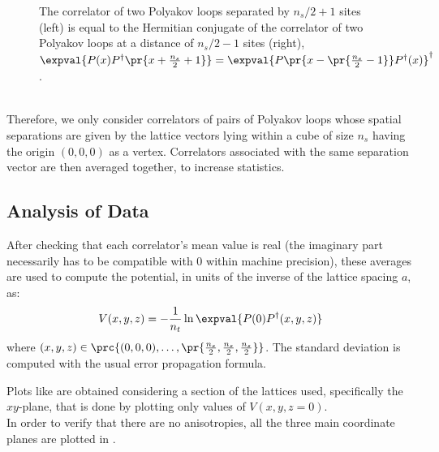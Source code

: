 \begin{figure}[!htbp]
\begin{subfigure}[b]{0.48\textwidth}
    \end{subfigure}
    \caption{The correlator of two Polyakov loops separated by $n_s/2+1$ sites (left) is equal to the Hermitian conjugate of the correlator of two Polyakov loops at a distance of $n_s/2-1$ sites (right), \ie $\expval{P(x)P^\dagger\pr{x+\frac{n_s}{2}+1}}=\expval{P\pr{x-\pr{\frac{n_s}{2}-1}}P^\dagger(x)}^\dagger$.}
    \label{4F:PolyakovPeriodic}
\end{figure}\\
Therefore, we only consider correlators of pairs of Polyakov loops whose spatial separations are given by the lattice vectors lying within a cube of size $n_s$ having the origin $(0,0,0)$ as a vertex.
Correlators associated with the same separation vector are then averaged together, to increase statistics.

\subsection{Analysis of Data}
After checking that each correlator's mean value is real (the imaginary part necessarily has to be compatible with $0$ within machine precision), these averages are used to compute the potential, in units of the inverse of the lattice spacing $a$, as:
\begin{equation}
    V(x,y,z) = -\frac{1}{n_t}\ln\expval{P(0)P^\dagger(x,y,z)} \label{4:Potential}
\end{equation}
where $(x,y,z)\in\prc{(0,0,0),\dots,\pr{\frac{n_s}{2},\frac{n_s}{2},\frac{n_s}{2}}}$.
The standard deviation is computed with the usual error propagation formula.

Plots like  are obtained considering a section of the lattices used, specifically the $xy$-plane, that is done by plotting only values of $V(x,y,z=0)$.\\
In order to verify that there are no anisotropies, all the three main coordinate planes are plotted in .

